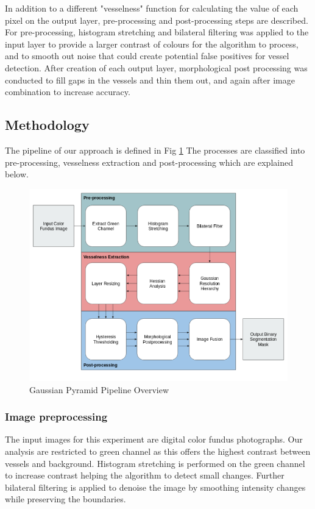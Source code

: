 \documentclass[conference]{IEEEtran}
\begin{document}
\par

In addition to a different "vesselness" function for calculating the value of each pixel on the output layer, pre-processing and post-processing steps are described. For pre-processing, histogram stretching and bilateral filtering was applied to the input layer to provide a larger contrast of colours for the algorithm to process, and to smooth out noise that could create potential false positives for vessel detection. After creation of each output layer, morphological post processing was conducted to fill gaps in the vessels and thin them out, and again after image combination to increase accuracy.


\subsection{Methodology}
\label{ssec:gmethod}

The pipeline of our approach is defined in Fig \ref{fig:gaussian} The processes are classified into pre-processing, vesselness extraction and post-processing which are explained below.

\begin{figure}[t]
	\centering
	\includegraphics[scale=0.7]{image/gaussian.PNG}
	\caption{Gaussian Pyramid Pipeline Overview}
	\label{fig:gaussian}
\end{figure}

\subsubsection{Image preprocessing}
\label{sssec:gpreprocess}
\par
The input images for this experiment are digital color fundus photographs. Our analysis are restricted to green channel as this offers the highest contrast between vessels and background. Histogram stretching is performed on the green channel to increase contrast helping the algorithm to detect small changes. Further bilateral filtering is applied to denoise the image by smoothing intensity changes while preserving the boundaries.
\end{document}
